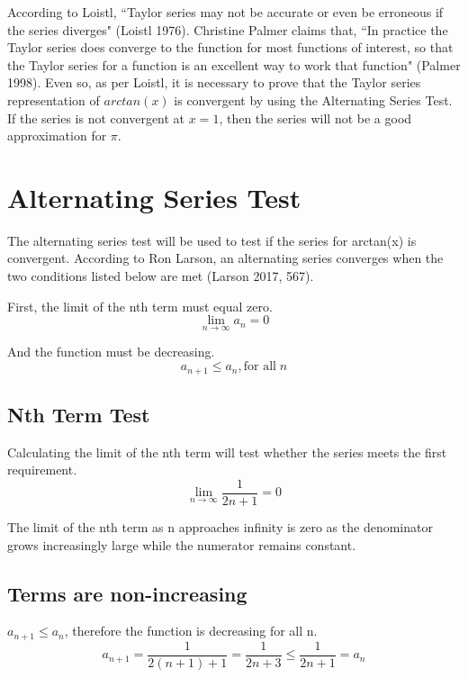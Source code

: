 \documentclass[12pt, titlepage]{article}
\begin{document}
According to Loistl, ``Taylor series may not be accurate or even be erroneous if the series diverges" (Loistl 1976). Christine Palmer claims that, ``In practice the Taylor series does converge to the function for most functions of interest, so that the Taylor series for a function is an excellent way to work that function" (Palmer 1998). Even so, as per Loistl, it is necessary to prove that the Taylor series representation of \(arctan(x)\) is convergent by using the Alternating Series Test. If the series is not convergent at \(x = 1\), then the series will not be a good approximation for \(\pi\).

\section{Alternating Series Test}
The alternating series test will be used to test if the series for arctan(x) is convergent. According to Ron Larson, an alternating series converges when the two conditions listed below are met (Larson 2017, 567).

First, the limit of the nth term must equal zero.
\begin{equation*}
    \lim_{n \to \infty} a_{n} = 0
\end{equation*}

And the function must be decreasing.
\begin{equation*}
    a_{n+1} \leq a_{n}, \textrm{for all} \; n
\end{equation*}

\subsection{Nth Term Test}
Calculating the limit of the nth term will test whether the series meets the first requirement.
\begin{equation*}
    \lim_{n \to \infty} \frac{1}{2n+1} = 0     
\end{equation*}

The limit of the nth term as n approaches infinity is zero as the denominator grows increasingly large while the numerator remains constant.

\subsection{Terms are non-increasing}
\(a_{n+1} \leq a_{n}\), therefore the function is decreasing for all n. 
\begin{equation*}
    a_{n+1} = \frac{1}{2(n+1) + 1} = \frac{1}{2n+3} \leq \frac{1}{2n+1} = a_{n}
\end{equation*}
\end{document}
